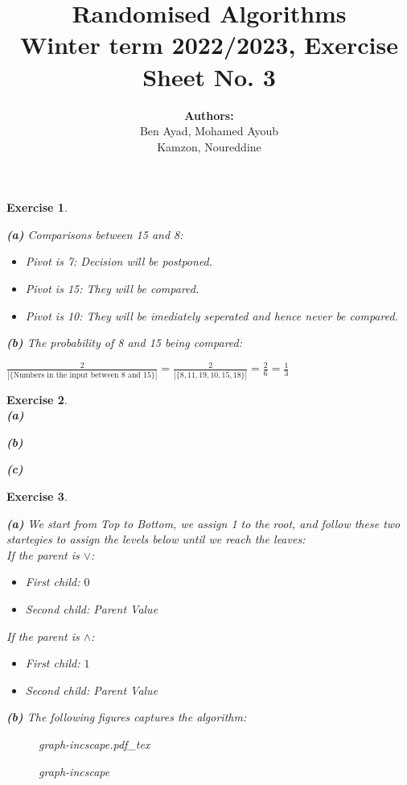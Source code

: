 \documentclass{article}
\title{Randomised Algorithms \\
Winter term 2022/2023, Exercise Sheet No. 3}
\author{
    \textbf{Authors:} \\
    Ben Ayad, Mohamed Ayoub \\
    Kamzon, Noureddine
}
\newcommand{\incfig}[1]{%
    \def\svgwidth{\columnwidth}
    {#1.pdf_tex}
}
\newtheorem{exo}{Exercise}
\begin{document}
\maketitle


\begin{exo}{\ \\}

\noindent
\textbf{(a)} Comparisons between 15 and 8:
\begin{itemize}
    \item Pivot is 7: Decision will be postponed.
    \item Pivot is 15: They will be compared.
    \item Pivot is 10: They will be imediately seperated and hence never be compared.
\end{itemize}
   
\noindent
\textbf{(b)} The probability of 8 and 15 being compared:

$\frac{2}{|\{\text{Numbers in the input between $8$ and $15$}\}|} = \frac{2}{|\{8,11,19,10,15,18\}|} = \frac{2}{6} = \frac{1}{3}    $


\end{exo}


\begin{exo}{\ \\}
\noindent
\textbf{(a)}

\noindent
\textbf{(b)}


\noindent
\textbf{(c)}

\end{exo}


\newpage
\begin{exo}{\ \\}

\textbf{(a)}
We start from Top to Bottom, we assign 1 to the root, and follow these two startegies  to assign the levels below until we reach the leaves:\\

If the parent is $\lor$:
\begin{itemize}
    \item First child: $0$
    \item Second child: Parent Value
\end{itemize}

If the parent is $\land$:
\begin{itemize}
    \item First child: $1$
    \item Second child: Parent Value
\end{itemize}

\textbf{(b)} The following figures captures the algorithm:
 
\begin{figure}[ht]
    \centering
    \incfig{graph-incscape}
    \caption{graph-incscape}
    \label{fig:graph-incscape}
\end{figure}


\end{exo}
\end{document}
